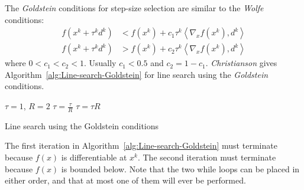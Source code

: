 \documentclass[a4paper,twoside,10pt,english]{report}
\begin{document}
The \emph{Goldstein}  conditions for step-size selection are similar to the 
\emph{Wolfe} conditions:
\begin{align}
f\left(x^{k}+\tau^{k}d^{k}\right) & < f\left(x^{k}\right)+
c_{1}\tau^{k}\left\langle \nabla_{x}f\left(x^{k}\right),d^{k}\right\rangle 
\tag{G1}\\
f\left(x^{k}+\tau^{k}d^{k}\right) & > f\left(x^{k}\right)+
c_{2}\tau^{k}\left\langle \nabla_{x}f\left(x^{k}\right),d^{k}\right\rangle
\tag{G2}
\end{align}
where $0<c_{1}<c_{2}<1$. Usually $c_{1}<0.5$ and $c_{2}=1-c_{1}$.
\emph{Christianson} gives Algorithm~\ref{alg:Line-search-Goldstein} for line
search using the \emph{Goldstein} conditions.
\begin{algorithm}[!htb]
\begin{algorithmic}
\State $\tau=1$, $R=2$
  \State $\tau=\frac{\tau}{R}$
\EndWhile
{}
  \State $\tau=\tau{}R$
\EndWhile
\end{algorithmic}
\caption{Line search using the Goldstein conditions}
\label{alg:Line-search-Goldstein}
\end{algorithm}
The first iteration in Algorithm~\ref{alg:Line-search-Goldstein}
must terminate because $f\left(x\right)$ is differentiable at $x^{k}$. The
second iteration must terminate because $f\left(x\right)$ is bounded below.
Note that the two while loops can be placed in either order, and that at most
one of them will ever be performed.
\end{document}
